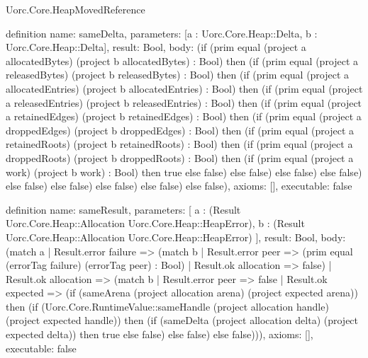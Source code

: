 \begin{lexlean}{Uorc.Core.HeapMovedReference}
\begin{semanticmodule}
definition{
  name: sameDelta,
  parameters: [a : Uorc.Core.Heap::Delta, b : Uorc.Core.Heap::Delta],
  result: Bool,
  body: (if (prim equal (project a allocatedBytes) (project b allocatedBytes) : Bool) then (if (prim equal (project a releasedBytes) (project b releasedBytes) : Bool) then (if (prim equal (project a allocatedEntries) (project b allocatedEntries) : Bool) then (if (prim equal (project a releasedEntries) (project b releasedEntries) : Bool) then (if (prim equal (project a retainedEdges) (project b retainedEdges) : Bool) then (if (prim equal (project a droppedEdges) (project b droppedEdges) : Bool) then (if (prim equal (project a retainedRoots) (project b retainedRoots) : Bool) then (if (prim equal (project a droppedRoots) (project b droppedRoots) : Bool) then (if (prim equal (project a work) (project b work) : Bool) then true else false) else false) else false) else false) else false) else false) else false) else false) else false),
  axioms: [],
  executable: false
}

definition{
  name: sameResult,
  parameters: [
    a : (Result Uorc.Core.Heap::Allocation Uorc.Core.Heap::HeapError),
    b : (Result Uorc.Core.Heap::Allocation Uorc.Core.Heap::HeapError)
  ],
  result: Bool,
  body: (match a
    | Result.error failure => (match b
      | Result.error peer => (prim equal (errorTag failure) (errorTag peer) : Bool)
      | Result.ok allocation => false)
    | Result.ok allocation => (match b
      | Result.error peer => false
      | Result.ok expected => (if (sameArena (project allocation arena) (project expected arena)) then (if (Uorc.Core.RuntimeValue::sameHandle (project allocation handle) (project expected handle)) then (if (sameDelta (project allocation delta) (project expected delta)) then true else false) else false) else false))),
  axioms: [],
  executable: false
}
\end{semanticmodule}
\end{lexlean}

